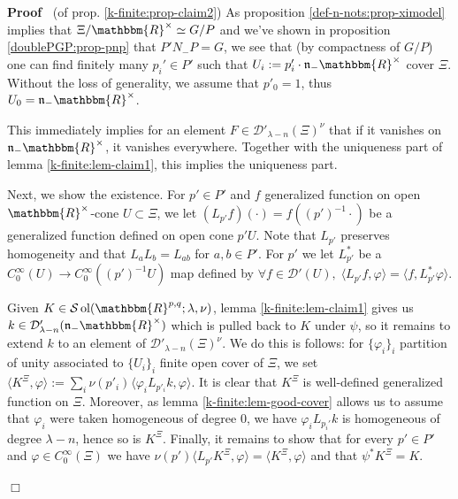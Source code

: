 \documentclass{article}
\newcommand{\assign}{:=}
\newcommand{\tmop}[1]{\ensuremath{\operatorname{#1}}}
\newenvironment{proof}{\noindent\textbf{Proof\ }}{\hspace*{\fill}$\Box$\medskip}
\numberwithin{definition}{section}
\numberwithin{lemma}{section}
\numberwithin{proposition}{section}
{\theorembodyfont{\rmfamily}\newtheorem{remark}{Remark}
\numberwithin{remark}{section}
}
\begin{document}
\begin{proof}
  (of prop. \ref{k-finite:prop-claim2}) As proposition
  \ref{def-n-nots:prop-ximodel} implies that $\Xi /\mathbbm{R}^{\times} \simeq
  G / P$ and we've shown in proposition \ref{doublePGP:prop-pnp} that $P' N_-
  P = G$, we see that (by compactness of $G / P$) one can find finitely many
  $p_i' \in P'$ such that $U_i \assign p_i' \cdot \mathfrak{n}_-
  \mathbbm{R}^{\times}$ cover $\Xi$. Without the loss of generality, we assume
  that $p'_0 = 1$, thus $U_0 =\mathfrak{n}_- \mathbbm{R}^{\times}$.
  
  This immediately implies for an element $F \in \mathcal{D}'_{\lambda - n} (
  \Xi)^{\nu}$ that if it vanishes on $\mathfrak{n}_- \mathbbm{R}^{\times}$, it
  vanishes everywhere. Together with the uniqueness part of lemma
  \ref{k-finite:lem-claim1}, this implies the uniqueness part.
  
  Next, we show the existence. For $p' \in P'$ and $f$ generalized function on
  open $\mathbbm{R}^{\times}$-cone $U \subset \Xi$, we let $( L_{p'} f) (
  \cdot) = f ( ( p')^{- 1} \cdot)$ be a generalized function defined on open
  cone $p' U$. Note that $L_{p'}$ preserves homogeneity and that $L_a L_b =
  L_{a b}$ for $a, b \in P'$. For $p'$ we let $L_{p'}^{\ast}$ be a
  $C_0^{\infty} ( U) \rightarrow C_0^{\infty} ( ( p')^{- 1} U)$ map defined by
  $\forall f \in \mathcal{D}' ( U), \; \langle L_{p'} f, \varphi \rangle =
  \langle f, L_{p'}^{\ast} \varphi \rangle$.
  
  Given $K \in \mathcal{S} \tmop{ol} ( \mathbbm{R}^{p, q} ; \lambda, \nu)$,
  lemma \ref{k-finite:lem-claim1} gives us $k \in \mathcal{D}'_{\lambda - n} (
  \mathfrak{n}_- \mathbbm{R}^{\times})$ which is pulled back to $K$ under
  $\psi$, so it remains to extend $k$ to an element of $\mathcal{D}'_{\lambda
  - n} ( \Xi)^{\nu}$. We do this is follows: for $\{ \varphi_i \}_i$ partition
  of unity associated to $\{ U_i \}_i$ finite open cover of $\Xi$, we set
  $\langle K^{\Xi}, \varphi \rangle \assign \sum_i \nu ( p'_i)^{} \langle
  \varphi_i L_{p'_i} k, \varphi \rangle$. It is clear that $K^{\Xi}$ is
  well-defined generalized function on $\Xi$. Moreover, as lemma
  \ref{k-finite:lem-good-cover} allows us to assume that $\varphi_i$ were
  taken homogeneous of degree 0, we have $\varphi_i L_{p_i'} k$ is homogeneous
  of degree $\lambda - n$, hence so is $K^{\Xi}$. Finally, it remains to show
  that for every $p' \in P'$ and $\varphi \in C^{\infty}_0 ( \Xi)$ we have
  $\nu ( p') \langle L_{p'} K^{\Xi}, \varphi \rangle = \langle K^{\Xi},
  \varphi \rangle$ and that $\psi^{\ast} K^{\Xi} = K$.
  

\end{proof}
\end{document}
